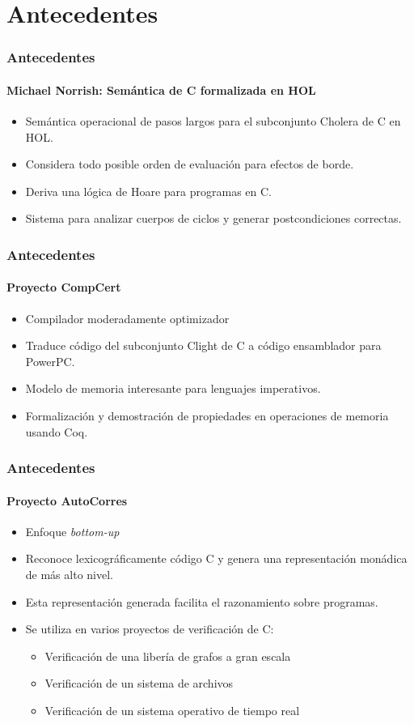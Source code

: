 \section{Antecedentes}


\begin{frame}
\frametitle{Antecedentes}
\framesubtitle{Michael Norrish: Semántica de C formalizada en HOL}

\begin{itemize}
\item{Semántica operacional de pasos largos para el subconjunto Cholera de C en HOL.}
\item{Considera todo posible orden de evaluación para efectos de borde.}
\item{Deriva una lógica de Hoare para programas en C.}
\item{Sistema para analizar cuerpos de ciclos y generar postcondiciones correctas.}
\end{itemize}


\end{frame}


\begin{frame}
\frametitle{Antecedentes}
\framesubtitle{Proyecto CompCert}

\begin{itemize}
\item{Compilador moderadamente optimizador}
\item{Traduce código del subconjunto Clight de C a código ensamblador para PowerPC.}
\item{Modelo de memoria interesante para lenguajes imperativos.}
\item{Formalización y demostración de propiedades en operaciones de memoria usando Coq.}
\end{itemize}


\end{frame}


\begin{frame}
\frametitle{Antecedentes}
\framesubtitle{Proyecto AutoCorres}

\begin{itemize}
\item{Enfoque \textit{bottom-up}}
\item{Reconoce lexicográficamente código C y genera una representación monádica de más alto nivel.}
\item{Esta representación generada facilita el razonamiento sobre programas.}
\item{Se utiliza en varios proyectos de verificación de C:}
\begin{itemize}
\item{Verificación de una libería de grafos a gran escala}
\item{Verificación de un sistema de archivos}
\item{Verificación de un sistema operativo de tiempo real}
\end{itemize}
\end{itemize}


\end{frame}
